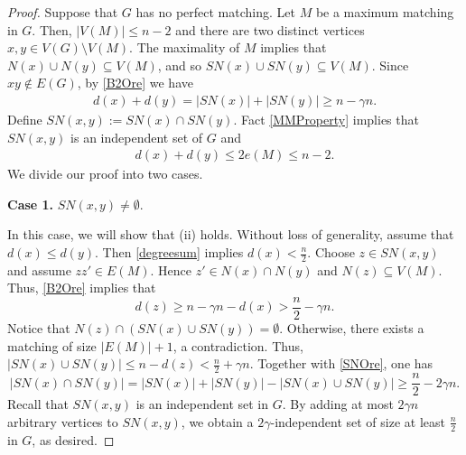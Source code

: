 \documentclass[11pt, a4paper]{article}
\theoremstyle{definition}
\newcommand{\<}{\subseteq}
\begin{document}
\begin{proof}
Suppose that $G$ has no perfect matching. Let $M$ be a maximum matching in $G$. Then, $|V(M)|\leq n-2$ and there are two  distinct vertices $x,y\in V(G)\setminus V(M)$. %
The maximality of $M$ implies that $N(x)\cup  N(y)\subseteq  V(M)$, and so $SN(x)\cup SN(y)\subseteq V(M)$. Since $xy\notin E(G)$,  %
by \eqref{B2Ore} we have 
\begin{align}\label{SNOre}
   d(x)+d(y)= |SN(x)|+|SN(y)|\ge n-\gamma n.
\end{align}
Define $SN(x,y):=SN(x)\cap SN(y)$. Fact \ref{MMProperty} implies that $SN(x,y)$ is an independent set of $G$ and  
\begin{align}\label{degreesum}
    d(x)+d(y)\leq 2e(M)\leq n-2.
\end{align}
We divide our proof into two cases.

\medskip
{\bf Case 1. } 
$SN(x,y)\ne \emptyset$. 
\medskip

In this case, we will show that (ii) holds. 
Without loss of generality, assume that $d(x)\le d(y)$. Then \eqref{degreesum} implies $d(x)<\frac{n}{2}$. Choose $z\in SN(x,y)$ and assume $zz'\in E(M)$. Hence  $z'\in N(x)\cap N(y)$ and  $N(z)\subseteq V(M)$.  Thus, \eqref{B2Ore} implies that 
$$
d(z)\ge n-\gamma n-d(x)>\frac{n}{2}-\gamma n.
$$
Notice that $N(z)\cap (SN(x)\cup SN(y))=\emptyset$. Otherwise, there exists a matching of size $|E(M)|+1$, a contradiction. Thus, 
$|SN(x)\cup SN(y)|\le n-d(z)<\frac{n}{2}+\gamma n$. Together  with \eqref{SNOre}, one has  
$$|SN(x)\cap SN(y)|= |SN(x)|+|SN(y)|-|SN(x)\cup SN(y)|\ge \frac{n}{2}-2\gamma n.$$
Recall that $SN(x,y)$ is an independent set in $G$. By adding at most $2\gamma n$ arbitrary vertices to $SN(x,y)$, we obtain a $2\gamma$-independent set of size at least $\frac{n}{2}$ in $G$, as desired. 





\end{proof}
\end{document}

